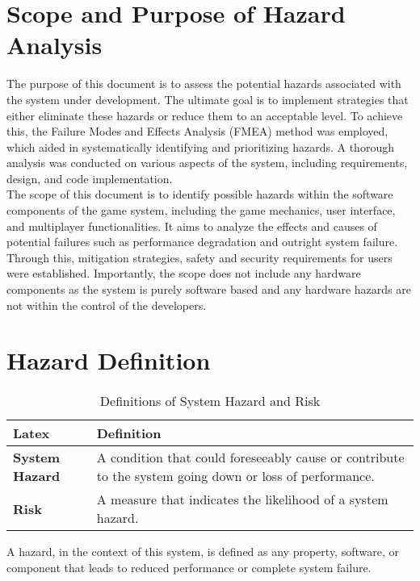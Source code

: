 \documentclass{article}
\begin{document}
\section{Scope and Purpose of Hazard Analysis}


The purpose of this document is to assess the potential hazards associated with the system under development. The ultimate goal is to implement strategies that either eliminate these hazards or reduce them to an acceptable level. To achieve this, the Failure Modes and Effects Analysis (FMEA) method was employed, which aided in systematically identifying and prioritizing hazards. A thorough analysis was conducted on various aspects of the system, including requirements, design, and code implementation.\\

The scope of this document is to identify possible hazards within the software components of the game system, including the game mechanics, user interface, and multiplayer functionalities. It aims to analyze the effects and causes of potential failures such as performance degradation and outright system failure. Through this, mitigation strategies, safety and security requirements for users were established. Importantly, the scope does not include any hardware components as the system is purely software based and any hardware hazards are not within the control of the developers.

\section{Hazard Definition}

\begin{table}[H]
    \centering
    \begin{tabular}{|l|p{10cm}|}
    \hline
    \textbf{Latex} & \textbf{Definition} \\ \hline
    \textbf{System Hazard} & A condition that could foreseeably cause or contribute to the system going down or loss of performance. \\ \hline
    \textbf{Risk} & A measure that indicates the likelihood of a system hazard. \\ \hline
    \end{tabular}
    \caption{Definitions of System Hazard and Risk}
\end{table}

A hazard, in the context of this system, is defined as any property, software, or component that leads to reduced performance or complete system failure.
\end{document}

